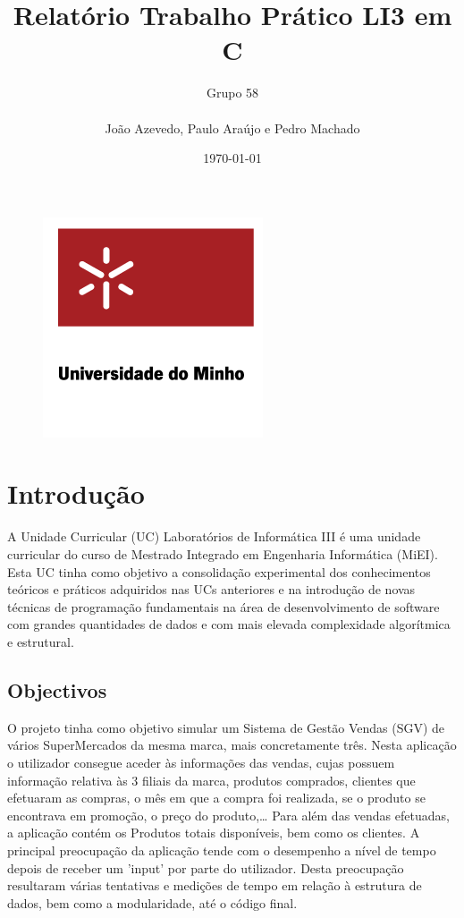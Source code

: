 \documentclass[a4paper,11pt]{report}
\begin{document}
\title{Relatório Trabalho Prático LI3 em C}
\author{Grupo 58\\
\\
João Azevedo, Paulo Araújo e Pedro Machado}
\date{\today}

\begin{figure}[t]
  \centering
  \includegraphics[scale=0.5]{uminho.png}
  \label{img:logo}
\end{figure}

\maketitle




\chapter{Introdução}

\quad A Unidade Curricular (UC)  Laboratórios de Informática III é uma unidade curricular do curso de Mestrado Integrado em Engenharia Informática (MiEI). Esta UC tinha como objetivo a consolidação experimental dos conhecimentos teóricos e práticos adquiridos nas UCs anteriores e na introdução de novas técnicas de programação fundamentais na área de desenvolvimento de software com grandes quantidades de dados e com mais elevada complexidade algorítmica e estrutural.


\section{Objectivos}

\quad O projeto tinha como objetivo simular um Sistema de Gestão Vendas (SGV) de vários SuperMercados da mesma marca, mais concretamente três. Nesta aplicação o utilizador consegue aceder às informações das vendas, cujas possuem informação relativa às 3 filiais da marca, produtos comprados, clientes que efetuaram as compras, o mês em que a compra foi realizada, se o produto se encontrava em promoção, o preço do produto,…
Para além das vendas efetuadas, a aplicação contém os Produtos totais disponíveis, bem como os clientes.
A principal preocupação da aplicação tende com o desempenho a nível de tempo depois de receber um 'input' por parte do utilizador. Desta preocupação resultaram várias tentativas e medições de tempo em relação à estrutura de dados, bem como a modularidade, até o código final.
\end{document}
